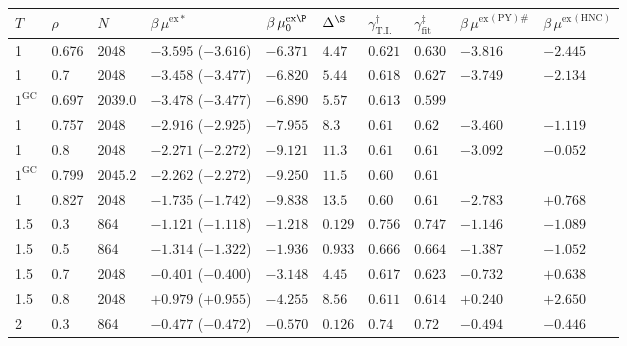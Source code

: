 \documentclass[preprint]{revtex4-1}
\newcommand{\supex}[1]{ { { #1 }^{ \mathrm{ex} } } }
\newcommand{\muex}{\supex{\mu}}
\begin{document}
\begin{table*}
  \begin{tabular}[c]{p{1cm} p{1.1cm} p{1.3cm} p{3cm} p{1.5cm} p{1.3cm} p{1.3cm} p{1.5cm}
    p{2.0cm} p{1.5cm}}
        $T$
    &   $\rho$
    &   $N$
    &   $\beta \, \mu^{\mathrm{ex} *}$
    &   $\beta \, \mu_0^{\mathrm{ex} \P}$
    &   $\Delta^\S$
    &   $\gamma_\mathrm{T.I.}^\dagger$
    &   $\gamma_\mathrm{fit}^\ddagger$
    &   $\beta \, \muex^{(\mathrm{PY}) \#}$
    &   $\beta \, \muex^{(\mathrm{HNC})}$
        \\
    \hline
     1    &   0.676   &  2048 &   $-3.595$ ($-3.616$)    & $-6.371$  &  $4.47$   &   $0.621$  &   $0.630$  &  $-3.816$ &  $-2.445$  \\
     1    &   0.7     &  2048 &   $-3.458$ ($-3.477$)    & $-6.820$  &  $5.44$   &   $0.618$  &   $0.627$  &  $-3.749$ &  $-2.134$  \\
     $1^\mathrm{GC}$
          &   $0.697$ & $2039.0$& $-3.478$ ($-3.477$)    & $-6.890$  &  $5.57$   &   $0.613$  &   $0.599$  &                        \\
     1    &   0.757   &  2048 &   $-2.916$ ($-2.925$)    & $-7.955$  &  $8.3 $   &   $0.61 $  &   $0.62 $  &  $-3.460$ &  $-1.119$  \\
     1    &   0.8     &  2048 &   $-2.271$ ($-2.272$)    & $-9.121$  &  $11.3$   &   $0.61 $  &   $0.61 $  &  $-3.092$ &  $-0.052$  \\
     $1^\mathrm{GC}$
          &   $0.799$ & $2045.2$& $-2.262$ ($-2.272$)    & $-9.250$  &  $11.5$   &   $0.60 $  &   $0.61 $  &                        \\
     1    &   0.827   &  2048 &   $-1.735$ ($-1.742$)    & $-9.838$  &  $13.5$   &   $0.60 $  &   $0.61 $  &  $-2.783$ &  $+0.768$  \\
    \hline
     1.5  &   0.3     &  864  &   $-1.121$ ($-1.118$)    & $-1.218$  &  $0.129$  &   $0.756$  &   $0.747$  &  $-1.146$ &  $-1.089$  \\
     1.5  &   0.5     &  864  &   $-1.314$ ($-1.322$)    & $-1.936$  &  $0.933$  &   $0.666$  &   $0.664$  &  $-1.387$ &  $-1.052$  \\
     1.5  &   0.7     &  2048 &   $-0.401$ ($-0.400$)    & $-3.148$  &  $4.45$   &   $0.617$  &   $0.623$  &  $-0.732$ &  $+0.638$  \\
     1.5  &   0.8     &  2048 &   $+0.979$ ($+0.955$)    & $-4.255$  &  $8.56$   &   $0.611$  &   $0.614$  &  $+0.240$ &  $+2.650$  \\
    \hline
     2    &   0.3     &  864  &   $-0.477$ ($-0.472$)    & $-0.570$  &  $0.126$  &   $0.74 $  &   $0.72 $  &  $-0.494$ &  $-0.446$  \\

\end{tabular}
\end{table*}
\end{document}
